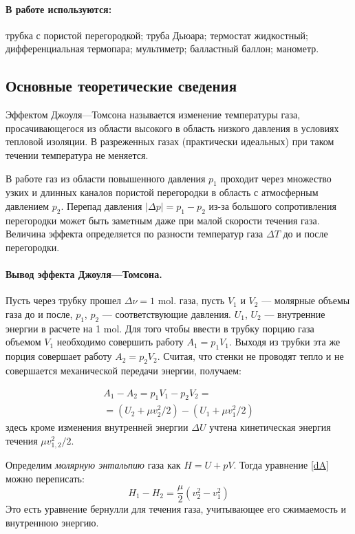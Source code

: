 \documentclass[a4paper,12pt]{report}
\begin{document}
        \paragraph*{В работе используются:} трубка с пористой перегородкой; труба Дьюара; термостат жидкостный; дифференциальная термопара; мультиметр; балластный баллон; манометр.
    \vspace{1cm}
    \begin{multicols}{2}
    \section{Основные теоретические сведения}
        Эффектом Джоуля---Томсона называется изменение температуры газа, просачивающегося из области высокого в область низкого давления в условиях тепловой изоляции. В разреженных газах (практически идеальных) при таком течении температура не меняется.

        В работе газ из области повышенного давления $p_1$ проходит через множество узких и длинных каналов пористой перегородки в область с атмосферным давлением $p_2$. Перепад давления $|\Delta p|=p_1-p_2$ из-за большого сопротивления перегородки может быть заметным даже при малой скорости течения газа. Величина эффекта определяется по разности температур газа $\Delta T$ до и после перегородки.

        \paragraph*{Вывод эффекта Джоуля---Томсона.} Пусть через трубку прошел $\Delta \nu = 1$ mol. газа, пусть $V_1$ и $V_2$ --- молярные объемы газа до и после, $p_1$, $p_2$ --- соответствующие давления. $U_1$, $U_2$ --- внутренние энергии в расчете на 1 mol. Для того чтобы ввести в трубку порцию газа объемом $V_1$ необходимо совершить работу $A_1=p_1V_1$. Выходя из трубки эта же порция совершает работу $A_2=p_2V_2$. Считая, что стенки не проводят тепло и не совершается механической передачи энергии, получаем:

        \begin{align}
            A_1-A_2=p_1V_1-p_2V_2=\nonumber\\
            =(U_2+\mu v_2^2/2)-(U_1+\mu v_1^2/2)
            \label{dA}
        \end{align}
        здесь кроме изменения внутренней энергии $\Delta U$ учтена кинетическая энергия течения $\mu v_{1,2}^2/2$.

        Определим \emph{молярную энтальпию} газа как $H=U+pV$. Тогда уравнение \eqref{dA} можно переписать:
        \begin{equation}
            H_1-H_2=\frac{\mu}{2}(v_2^2-v_1^2)
            \label{dH}
        \end{equation}
        Это есть уравнение бернулли для течения газа, учитывающее его сжимаемость и внутреннюю энергию.
        

\end{multicols}
\end{document}
